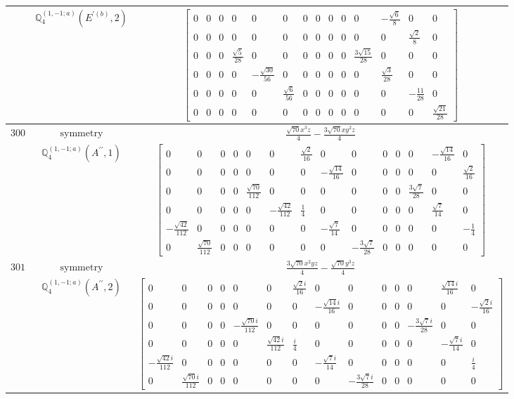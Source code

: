 \documentclass[fleqn,8pt,landscape]{jsarticle}
\begin{document}
\begin{longtable}{ccc}
$  $ & $ \mathbb{Q}_{4}^{(1,-1;a)}(E^{\prime(b)},2) $ & $ \begin{bmatrix} 0 & 0 & 0 & 0 & 0 & 0 & 0 & 0 & 0 & 0 & 0 & - \frac{\sqrt{6}}{8} & 0 & 0 \\ 0 & 0 & 0 & 0 & 0 & 0 & 0 & 0 & 0 & 0 & 0 & 0 & \frac{\sqrt{2}}{8} & 0 \\ 0 & 0 & 0 & \frac{\sqrt{5}}{28} & 0 & 0 & 0 & 0 & 0 & 0 & \frac{3 \sqrt{15}}{28} & 0 & 0 & 0 \\ 0 & 0 & 0 & 0 & - \frac{\sqrt{30}}{56} & 0 & 0 & 0 & 0 & 0 & 0 & \frac{\sqrt{3}}{28} & 0 & 0 \\ 0 & 0 & 0 & 0 & 0 & \frac{\sqrt{6}}{56} & 0 & 0 & 0 & 0 & 0 & 0 & - \frac{11}{28} & 0 \\ 0 & 0 & 0 & 0 & 0 & 0 & 0 & 0 & 0 & 0 & 0 & 0 & 0 & \frac{\sqrt{21}}{28} \end{bmatrix} $ \\ \hline
$ 300 $ & $ \text{symmetry} $ & $ \frac{\sqrt{70} x^{3} z}{4} - \frac{3 \sqrt{70} x y^{2} z}{4} $ \\
$  $ & $ \mathbb{Q}_{4}^{(1,-1;a)}(A^{\prime\prime},1) $ & $ \begin{bmatrix} 0 & 0 & 0 & 0 & 0 & 0 & \frac{\sqrt{2}}{16} & 0 & 0 & 0 & 0 & 0 & - \frac{\sqrt{14}}{16} & 0 \\ 0 & 0 & 0 & 0 & 0 & 0 & 0 & - \frac{\sqrt{14}}{16} & 0 & 0 & 0 & 0 & 0 & \frac{\sqrt{2}}{16} \\ 0 & 0 & 0 & 0 & \frac{\sqrt{70}}{112} & 0 & 0 & 0 & 0 & 0 & 0 & \frac{3 \sqrt{7}}{28} & 0 & 0 \\ 0 & 0 & 0 & 0 & 0 & - \frac{\sqrt{42}}{112} & \frac{1}{4} & 0 & 0 & 0 & 0 & 0 & \frac{\sqrt{7}}{14} & 0 \\ - \frac{\sqrt{42}}{112} & 0 & 0 & 0 & 0 & 0 & 0 & - \frac{\sqrt{7}}{14} & 0 & 0 & 0 & 0 & 0 & - \frac{1}{4} \\ 0 & \frac{\sqrt{70}}{112} & 0 & 0 & 0 & 0 & 0 & 0 & - \frac{3 \sqrt{7}}{28} & 0 & 0 & 0 & 0 & 0 \end{bmatrix} $ \\ \hline
$ 301 $ & $ \text{symmetry} $ & $ \frac{3 \sqrt{70} x^{2} y z}{4} - \frac{\sqrt{70} y^{3} z}{4} $ \\
$  $ & $ \mathbb{Q}_{4}^{(1,-1;a)}(A^{\prime\prime},2) $ & $ \begin{bmatrix} 0 & 0 & 0 & 0 & 0 & 0 & \frac{\sqrt{2} i}{16} & 0 & 0 & 0 & 0 & 0 & \frac{\sqrt{14} i}{16} & 0 \\ 0 & 0 & 0 & 0 & 0 & 0 & 0 & - \frac{\sqrt{14} i}{16} & 0 & 0 & 0 & 0 & 0 & - \frac{\sqrt{2} i}{16} \\ 0 & 0 & 0 & 0 & - \frac{\sqrt{70} i}{112} & 0 & 0 & 0 & 0 & 0 & 0 & - \frac{3 \sqrt{7} i}{28} & 0 & 0 \\ 0 & 0 & 0 & 0 & 0 & \frac{\sqrt{42} i}{112} & \frac{i}{4} & 0 & 0 & 0 & 0 & 0 & - \frac{\sqrt{7} i}{14} & 0 \\ - \frac{\sqrt{42} i}{112} & 0 & 0 & 0 & 0 & 0 & 0 & - \frac{\sqrt{7} i}{14} & 0 & 0 & 0 & 0 & 0 & \frac{i}{4} \\ 0 & \frac{\sqrt{70} i}{112} & 0 & 0 & 0 & 0 & 0 & 0 & - \frac{3 \sqrt{7} i}{28} & 0 & 0 & 0 & 0 & 0 \end{bmatrix} $ \\ \hline

\end{longtable}
\end{document}
